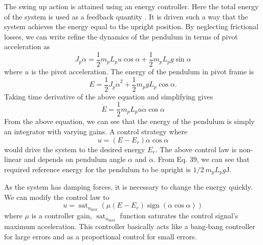 \documentclass[superscriptaddress,floatfix,reprint,amssymb, amsmath,aps, pre]{revtex4-1}
\begin{document}
{{{            The swing up action is attained using an energy controller. Here the total energy of the system is used as a feedback quantity \cite{astrom_swinging_1996} \cite{akhtaruzzaman_modeling_2010}. It is driven such a way that the system achieves the energy equal to the upright position. By neglecting frictional losses, we can write refine the dynamics of the pendulum in terms of pivot acceleration as 
            \begin{equation}
                J_{p} \ddot{\alpha} = \frac{1}{2} m_{p} L_{p} u \cos \alpha + \frac{1}{2} m_{p}  L_{p} g\sin \alpha
            \end{equation}
            where \(u\) is the pivot acceleration. The energy of the pendulum in pivot frame is 
            \begin{equation}
                E=\frac{1}{2} J_{p} \dot{\alpha}^{2}+\frac{1}{2} m_{p} g L_{p}\cos \alpha.
            \end{equation}
            Taking time derivative of the above equation and simplifying gives 
            \begin{equation}
                \dot{E}= \frac{1}{2} m_{p} L_{p} u \dot{\alpha} \cos \alpha
            \end{equation}
            From the above equation, we can see that the energy of the pendulum is simply an integrator with varying gains. A control strategy where 
            \begin{equation}
                u=\left(E-E_{r}\right) \dot{\alpha} \cos \alpha
            \end{equation}
            would drive the system to the desired energy \(E_r\). The above control law is non-linear and depends on pendulum angle \(\alpha\) and \(\dot \alpha\). From Eq. 39, we can see that required reference energy for the pendulum to be upright is \(1/2 \ m_p L_p g\)J. 

            As the system has damping forces, it is necessary to change the energy quickly. We can modify the control law to 
            \begin{equation}
                u = \operatorname{sat}_{u_{\max }}\left(\mu\left(E-E_{r}\right) \operatorname{sign}(\dot{\alpha} \cos \alpha)\right) \label{eq:uControlEq}
            \end{equation}
            where \(\mu\) is a controller gain, \(\operatorname{sat}_{u_{\max }}\) function saturates the control signal's maximum acceleration. This controller basically acts like a bang-bang controller for large errors and as a proportional control for small errors.

}}}
\end{document}
